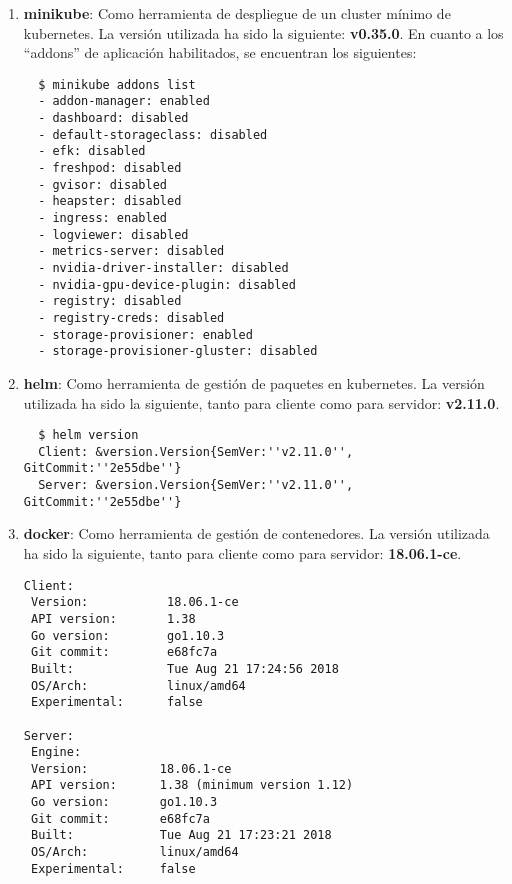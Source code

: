 \documentclass[12pt,spanish]{article}
\begin{document}
\begin{enumerate}
\item{\textbf{minikube}:} Como herramienta de despliegue de un cluster mínimo de kubernetes. La versión utilizada ha sido la siguiente: \textbf{v0.35.0}.
  En cuanto a los ``addons'' de aplicación habilitados, se encuentran los siguientes:
\begin{verbatim}
  $ minikube addons list
  - addon-manager: enabled
  - dashboard: disabled
  - default-storageclass: disabled
  - efk: disabled
  - freshpod: disabled
  - gvisor: disabled
  - heapster: disabled
  - ingress: enabled
  - logviewer: disabled
  - metrics-server: disabled
  - nvidia-driver-installer: disabled
  - nvidia-gpu-device-plugin: disabled
  - registry: disabled
  - registry-creds: disabled
  - storage-provisioner: enabled
  - storage-provisioner-gluster: disabled
\end{verbatim}

\item{\textbf{helm}:} Como herramienta de gestión de paquetes en kubernetes. La versión utilizada ha sido la siguiente, tanto para cliente como para servidor: \textbf{v2.11.0}.
\begin{verbatim}
  $ helm version
  Client: &version.Version{SemVer:''v2.11.0'', GitCommit:''2e55dbe''}
  Server: &version.Version{SemVer:''v2.11.0'', GitCommit:''2e55dbe''}
\end{verbatim}

\item{\textbf{docker}:} Como herramienta de gestión de contenedores. La versión utilizada ha sido la siguiente, tanto para cliente como para servidor: \textbf{18.06.1-ce}.
\begin{verbatim}
Client:
 Version:           18.06.1-ce
 API version:       1.38
 Go version:        go1.10.3
 Git commit:        e68fc7a
 Built:             Tue Aug 21 17:24:56 2018
 OS/Arch:           linux/amd64
 Experimental:      false

Server:
 Engine:
 Version:          18.06.1-ce
 API version:      1.38 (minimum version 1.12)
 Go version:       go1.10.3
 Git commit:       e68fc7a
 Built:            Tue Aug 21 17:23:21 2018
 OS/Arch:          linux/amd64
 Experimental:     false
\end{verbatim}

\end{enumerate}
\end{document}
